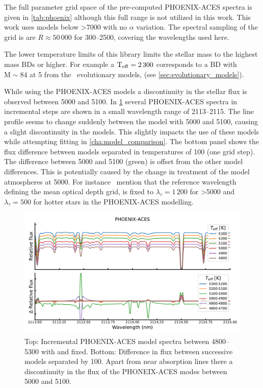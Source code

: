 The full parameter grid space of the pre-computed {PHOENIX-ACES} spectra is given in \cref{tab:phoenix} although this full range is not utilized in this work.
This work uses models below >7000\K{} with no $\alpha$ variation.
The spectral sampling of the grid is are $R \approx 50\,000$ for 300--2500\nm, covering the wavelengths used here.



The lower temperature limits of this library limits the stellar mass to the highest mass BDs or higher.
For example a \(\textrm{T}_{\mathrm{eff}}{}=2\,300\)\K{} corresponds to a {BD} with \(\textrm{M}\sim84\)\Mjup{} at 5\Gyr{} from the~\citet{baraffe_evolutionary_2003} evolutionary models, (see \cref{sec:evolutionary_models}).


While using the {PHOENIX-ACES} models a discontinuity in the stellar flux is observed between 5000\K{} and 5100\K{}.
In \cref{fig:phoenixdiffereceat5000k} several {PHOENIX-ACES} spectra in incremental steps are shown in a small wavelength range of 2113--2115\nm{}.
The line profile seems to change suddenly between the model with 5000\K{} and 5100\K{}, causing a slight discontinuity in the models.
This slightly impacts the use of these models while attempting \textchisquared{} fitting in \cref{cha:model_comparison}.
The bottom panel shows the flux difference between models separated in temperatures of 100\K{} (one grid step).
The difference between 5000 and 5100\K{} (green) is offset from the other model differences.
This is potentially caused by the change in treatment of the model atmospheres at 5000\K{}.
For instance~\citet{husser_new_2013} mention that the reference wavelength defining the mean optical depth grid, is fixed to $\lambda_{\tau}=1\,200$\nm{} for \txteff{}>5000\K{} and $\lambda_{\tau}=500$\nm{} for hotter stars in the {PHOENIX-ACES} modelling.

\begin{figure}
    \centering
    \includegraphics[width=0.7\linewidth]{figures/atmos_and_models/phoenix_differece_at_5000K}
    \caption{Top: Incremental {PHOENIX-ACES} model spectra between 4800--5300\K{} with  and  fixed.
    Bottom: Difference in flux between successive models separated by 100\K{}.
    Apart from near absorption lines there a discontinuity in the flux of the PHONEIX-ACES modes between 5000 and 5100\K{}.}
    \label{fig:phoenixdiffereceat5000k}
\end{figure}


